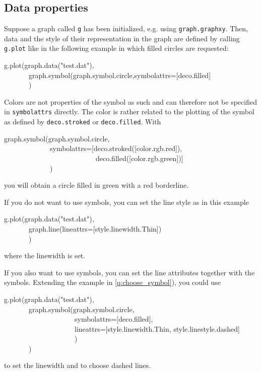 \documentclass[11pt,DIV14]{scrartcl}
\begin{document}
\subsection{Data properties}

{}
{\label{q:choose_symbol}
Suppose a graph called \texttt{g} has been initialized, e.g. using
\texttt{graph.graphxy}. Then, data and the style of their representation
in the graph are defined by calling \texttt{g.plot} like in the following
example in which filled circles are requested:
\begin{progcode}
g.plot(graph.data("test.dat"),\\
~~~~~~~graph.symbol(graph.symbol.circle,symbolattrs=[deco.filled]\\
~~~~~~~)
\end{progcode}
}

{}
{Colors are not properties of the symbol as such and can therefore not
be specified in \texttt{symbolattrs} directly. The color is rather related
to the plotting of the symbol as defined by \texttt{deco.stroked} or
\texttt{deco.filled}. With
\begin{progcode}
graph.symbol(graph.symbol.circle,\\
~~~~~~~~~~~~~symbolattrs=[deco.stroked([color.rgb.red]),\\
~~~~~~~~~~~~~~~~~~~~~~~~~~deco.filled([color.rgb.green])]\\
~~~~~~~~~~~~~)
\end{progcode}
you will obtain a circle filled in green with a red borderline.
}

{}
{If you do not want to use symbols, you can set the line style as in this
example
\begin{progcode}
g.plot(graph.data("test.dat"),\\
~~~~~~~graph.line(lineattrs=[style.linewidth.Thin])\\
~~~~~~~)
\end{progcode}
where the linewidth is set.

If you also want to use symbols, you can set the line attributes together
with the symbols.  Extending the example in \ref{q:choose_symbol}),
you could use
\begin{progcode}
g.plot(graph.data("test.dat"),\\
~~~~~~~graph.symbol(graph.symbol.circle, \\
~~~~~~~~~~~~~~~~~~~~symbolattrs=[deco.filled],\\
~~~~~~~~~~~~~~~~~~~~lineattrs=[style.linewidth.Thin, style.linestyle.dashed]\\
~~~~~~~~~~~~~~~~~~~~)\\
~~~~~~~)
\end{progcode}
to set the linewidth and to choose dashed lines. 
}
\end{document}
